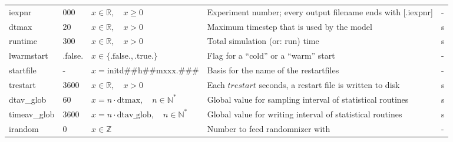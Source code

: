 \documentclass[twoside,11pt,fleqn,a4paper,english,openright]{report}
\begin{document}
\begin{center}
  \tablelasttail{
        &&&&\\\hline
  }
\begin{supertabular}{|l|p{1.6cm}|p{4.4cm}|p{6cm}|l|}
  iexpnr	& 000		& $x \in \mathbb{R}, \quad x \geq 0$		& Experiment number; every output filename ends with [.iexpnr]	& -\\
  dtmax		& 20		& $x \in \mathbb{R}, \quad x>0$		& Maximum timestep that is used by the model	& s\\
  runtime	& 300		& $x \in \mathbb{R}, \quad x>0$		& Total simulation (or: run) time		& s\\
  lwarmstart& .false.	& $x\in\{\text{.false.},\text{.true.}\}$		& Flag for a ``cold'' or a  ``warm'' start	& -\\
  startfile	& -		& $x = \text{initd\#\#h\#\#mxxx.\#\#\#}$	& Basis for the name of the restartfiles	& -\\
  trestart	& 3600		& $x \in \mathbb{R}, \quad x>0$		& Each $trestart$ seconds, a restart file is written to disk	& s\\
  dtav\_glob	& 60		& $x = n \cdot \text{dtmax}, \quad n \in \mathbb{N}^*$		& Global value for sampling interval of statistical routines	& s\\
  timeav\_glob	& 3600		& $x = n \cdot \text{dtav\_glob}, \quad n \in \mathbb{N}^*$	& Global value for writing interval of statistical routines	& s\\
  irandom	& 0		& $x \in \mathbb{Z}$			& Number to feed randomnizer with		& -\\

\end{supertabular}
\end{center}
\end{document}
